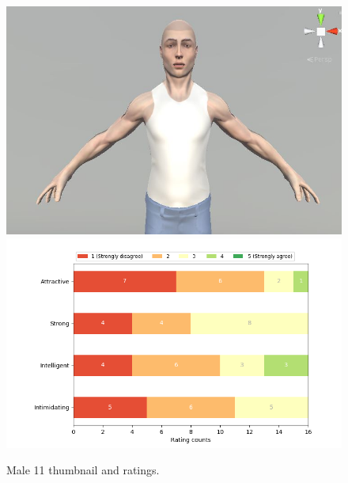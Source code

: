 \begin{figure}[H]
  \includegraphics[width=\linewidth]{Images/Males/11.JPG}
\endminipage\hfill
{}
  \includegraphics[width=\linewidth]{Survey/MRatings/avatar_m11.png}
\endminipage\hfill
\caption{Male 11 thumbnail and ratings.}
\end{figure}

